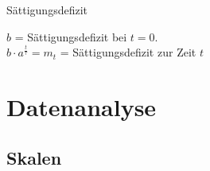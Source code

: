 \begin{multicols}{2}

\begin{bemerkung*}{Sättigungsdefizit}{}

$b$ = Sättigungsdefizit bei $t=0$.\\
$b\cdot{}a^\frac{t}\tau = m_t$ = Sättigungsdefizit zur Zeit $t$
\end{bemerkung*}

\end{multicols}

\hrulefill
\section*{Datenanalyse}

\subsection*{Skalen}
\vspace{5mm}


